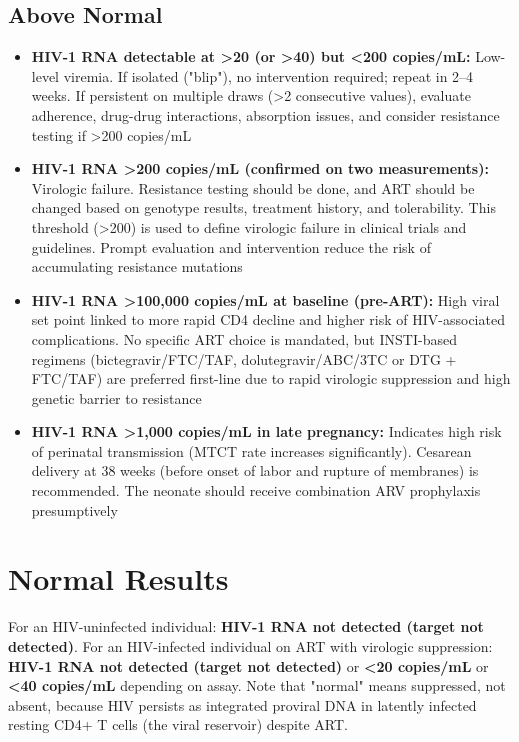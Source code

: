 \subsection*{Above Normal}
\begin{itemize}
  \item \textbf{HIV-1 RNA detectable at >20 (or >40) but <200 copies/mL:} Low-level viremia. If isolated ("blip"), no intervention required; repeat in 2--4 weeks. If persistent on multiple draws (>2 consecutive values), evaluate adherence, drug-drug interactions, absorption issues, and consider resistance testing if >200 copies/mL
  \item \textbf{HIV-1 RNA >200 copies/mL (confirmed on two measurements):} Virologic failure. Resistance testing should be done, and ART should be changed based on genotype results, treatment history, and tolerability. This threshold (>200) is used to define virologic failure in clinical trials and guidelines. Prompt evaluation and intervention reduce the risk of accumulating resistance mutations
  \item \textbf{HIV-1 RNA >100,000 copies/mL at baseline (pre-ART):} High viral set point linked to more rapid CD4 decline and higher risk of HIV-associated complications. No specific ART choice is mandated, but INSTI-based regimens (bictegravir/FTC/TAF, dolutegravir/ABC/3TC or DTG + FTC/TAF) are preferred first-line due to rapid virologic suppression and high genetic barrier to resistance
  \item \textbf{HIV-1 RNA >1,000 copies/mL in late pregnancy:} Indicates high risk of perinatal transmission (MTCT rate increases significantly). Cesarean delivery at 38 weeks (before onset of labor and rupture of membranes) is recommended. The neonate should receive combination ARV prophylaxis presumptively
\end{itemize}

\section*{Normal Results}
For an HIV-uninfected individual: \textbf{HIV-1 RNA not detected (target not detected)}. For an HIV-infected individual on ART with virologic suppression: \textbf{HIV-1 RNA not detected (target not detected)} or \textbf{<20 copies/mL} or \textbf{<40 copies/mL} depending on assay. Note that "normal" means suppressed, not absent, because HIV persists as integrated proviral DNA in latently infected resting CD4+ T cells (the viral reservoir) despite ART.

